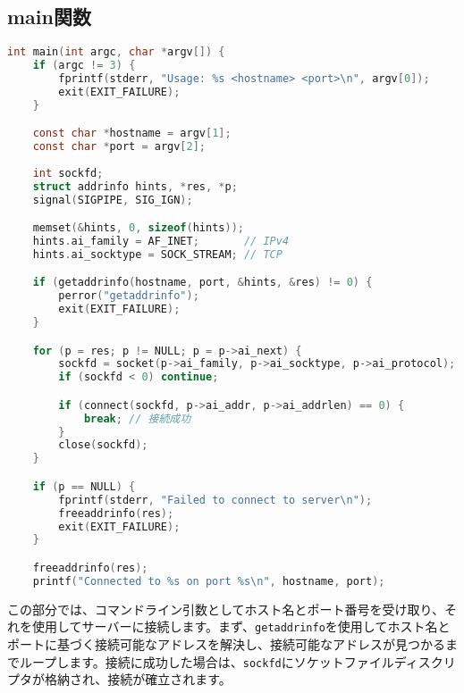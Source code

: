\documentclass{article}
\begin{document}
\subsection{main関数}
\begin{lstlisting}[language=C]
int main(int argc, char *argv[]) { 
    if (argc != 3) {
        fprintf(stderr, "Usage: %s <hostname> <port>\n", argv[0]);
        exit(EXIT_FAILURE);
    }

    const char *hostname = argv[1];
    const char *port = argv[2];
    
    int sockfd;
    struct addrinfo hints, *res, *p;
    signal(SIGPIPE, SIG_IGN);

    memset(&hints, 0, sizeof(hints));
    hints.ai_family = AF_INET;       // IPv4
    hints.ai_socktype = SOCK_STREAM; // TCP

    if (getaddrinfo(hostname, port, &hints, &res) != 0) {
        perror("getaddrinfo");
        exit(EXIT_FAILURE);
    }

    for (p = res; p != NULL; p = p->ai_next) {
        sockfd = socket(p->ai_family, p->ai_socktype, p->ai_protocol);
        if (sockfd < 0) continue;

        if (connect(sockfd, p->ai_addr, p->ai_addrlen) == 0) {
            break; // 接続成功
        }
        close(sockfd);
    }

    if (p == NULL) {
        fprintf(stderr, "Failed to connect to server\n");
        freeaddrinfo(res);
        exit(EXIT_FAILURE);
    }

    freeaddrinfo(res);
    printf("Connected to %s on port %s\n", hostname, port);
\end{lstlisting}
この部分では、コマンドライン引数としてホスト名とポート番号を受け取り、それを使用してサーバーに接続します。まず、\texttt{getaddrinfo}を使用してホスト名とポートに基づく接続可能なアドレスを解決し、接続可能なアドレスが見つかるまでループします。接続に成功した場合は、\texttt{sockfd}にソケットファイルディスクリプタが格納され、接続が確立されます。
\end{document}
